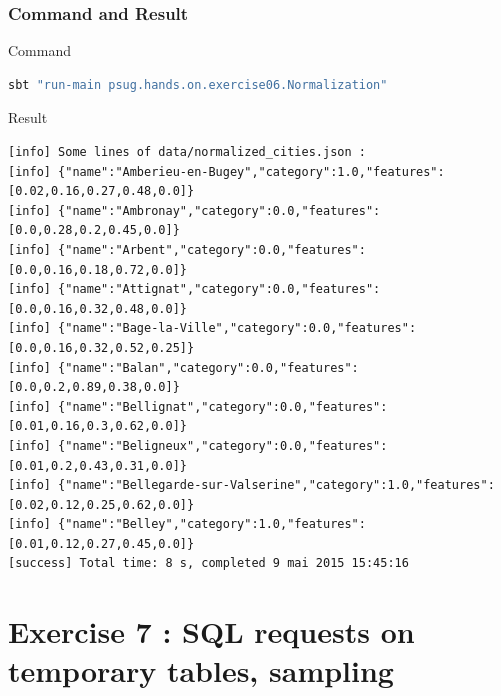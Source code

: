 \documentclass[slidetop,9pt,utf8]{beamer}
\begin{document}
\begin{frame}[fragile]
  \frametitle{Command and Result}

  \begin{block}{Command}
    \begin{lstlisting}[language=bash, style=terminal-medium]
sbt "run-main psug.hands.on.exercise06.Normalization"  
    \end{lstlisting}
  \end{block}

  \begin{block}{Result}
    \begin{lstlisting}[style=terminal]
[info] Some lines of data/normalized_cities.json : 
[info] {"name":"Amberieu-en-Bugey","category":1.0,"features":[0.02,0.16,0.27,0.48,0.0]}
[info] {"name":"Ambronay","category":0.0,"features":[0.0,0.28,0.2,0.45,0.0]}
[info] {"name":"Arbent","category":0.0,"features":[0.0,0.16,0.18,0.72,0.0]}
[info] {"name":"Attignat","category":0.0,"features":[0.0,0.16,0.32,0.48,0.0]}
[info] {"name":"Bage-la-Ville","category":0.0,"features":[0.0,0.16,0.32,0.52,0.25]}
[info] {"name":"Balan","category":0.0,"features":[0.0,0.2,0.89,0.38,0.0]}
[info] {"name":"Bellignat","category":0.0,"features":[0.01,0.16,0.3,0.62,0.0]}
[info] {"name":"Beligneux","category":0.0,"features":[0.01,0.2,0.43,0.31,0.0]}
[info] {"name":"Bellegarde-sur-Valserine","category":1.0,"features":[0.02,0.12,0.25,0.62,0.0]}
[info] {"name":"Belley","category":1.0,"features":[0.01,0.12,0.27,0.45,0.0]}
[success] Total time: 8 s, completed 9 mai 2015 15:45:16
    \end{lstlisting}
  \end{block}

\end{frame}

%
%
%
%

\section{Exercise 7 : SQL requests on temporary tables, sampling}
\end{document}
